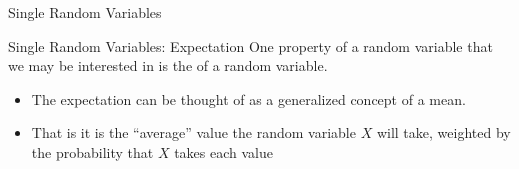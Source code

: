 \documentclass[notheorems,9pt]{beamer}
\begin{document}
\begin{frame}{Single Random Variables} 
	\centering{}	
\end{frame}
\begin{frame}{Single Random Variables: Expectation} 
	\label{frame:srv-mean}
	One property of a random variable that we may be interested in is the  of a random variable. 
	\begin{itemize}
		\item The expectation can be thought of as a generalized concept of a mean.
		\item That is it is the ``average'' value the random variable \(X\) will take, weighted by the probability that \(X\) takes each value
	\end{itemize}
\end{frame}
\end{document}
